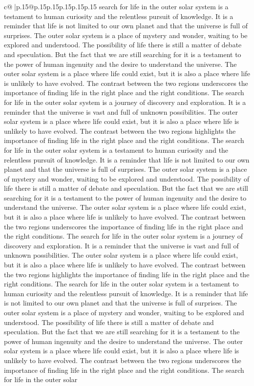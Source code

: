 \documentclass{article}
\begin{document}
{\begin{supertabular}{c@{$\;$}|p{.15\linewidth}@{}p{.15\linewidth}p{.15\linewidth}p{.15\linewidth}p{.15\linewidth}p{.15\linewidth}}
{{{search for life in the outer solar system is a testament to human curiosity and the relentless pursuit of knowledge. It is a reminder that life is not limited to our own planet and that the universe is full of surprises. The outer solar system is a place of mystery and wonder, waiting to be explored and understood. The possibility of life there is still a matter of debate and speculation. But the fact that we are still searching for it is a testament to the power of human ingenuity and the desire to understand the universe. The outer solar system is a place where life could exist, but it is also a place where life is unlikely to have evolved. The contrast between the two regions underscores the importance of finding life in the right place and the right conditions. The search for life in the outer solar system is a journey of discovery and exploration. It is a reminder that the universe is vast and full of unknown possibilities. The outer solar system is a place where life could exist, but it is also a place where life is unlikely to have evolved. The contrast between the two regions highlights the importance of finding life in the right place and the right conditions. The search for life in the outer solar system is a testament to human curiosity and the relentless pursuit of knowledge. It is a reminder that life is not limited to our own planet and that the universe is full of surprises. The outer solar system is a place of mystery and wonder, waiting to be explored and understood. The possibility of life there is still a matter of debate and speculation. But the fact that we are still searching for it is a testament to the power of human ingenuity and the desire to understand the universe. The outer solar system is a place where life could exist, but it is also a place where life is unlikely to have evolved. The contrast between the two regions underscores the importance of finding life in the right place and the right conditions. The search for life in the outer solar system is a journey of discovery and exploration. It is a reminder that the universe is vast and full of unknown possibilities. The outer solar system is a place where life could exist, but it is also a place where life is unlikely to have evolved. The contrast between the two regions highlights the importance of finding life in the right place and the right conditions. The search for life in the outer solar system is a testament to human curiosity and the relentless pursuit of knowledge. It is a reminder that life is not limited to our own planet and that the universe is full of surprises. The outer solar system is a place of mystery and wonder, waiting to be explored and understood. The possibility of life there is still a matter of debate and speculation. But the fact that we are still searching for it is a testament to the power of human ingenuity and the desire to understand the universe. The outer solar system is a place where life could exist, but it is also a place where life is unlikely to have evolved. The contrast between the two regions underscores the importance of finding life in the right place and the right conditions. The search for life in the outer solar }}}
\end{supertabular}}
\end{document}
